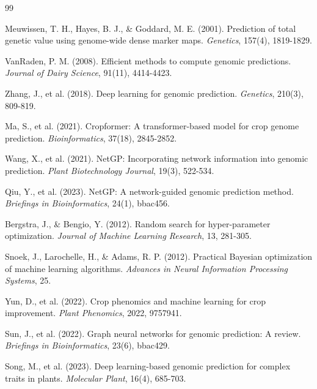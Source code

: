 \documentclass[11pt,a4paper]{article}
\begin{document}

\begin{thebibliography}{99}

Meuwissen, T. H., Hayes, B. J., \& Goddard, M. E. (2001).
Prediction of total genetic value using genome-wide dense marker maps.
\textit{Genetics}, 157(4), 1819-1829.

VanRaden, P. M. (2008).
Efficient methods to compute genomic predictions.
\textit{Journal of Dairy Science}, 91(11), 4414-4423.

Zhang, J., et al. (2018).
Deep learning for genomic prediction.
\textit{Genetics}, 210(3), 809-819.

Ma, S., et al. (2021).
Cropformer: A transformer-based model for crop genome prediction.
\textit{Bioinformatics}, 37(18), 2845-2852.

Wang, X., et al. (2021).
NetGP: Incorporating network information into genomic prediction.
\textit{Plant Biotechnology Journal}, 19(3), 522-534.

Qiu, Y., et al. (2023).
NetGP: A network-guided genomic prediction method.
\textit{Briefings in Bioinformatics}, 24(1), bbac456.

Bergstra, J., \& Bengio, Y. (2012).
Random search for hyper-parameter optimization.
\textit{Journal of Machine Learning Research}, 13, 281-305.

Snoek, J., Larochelle, H., \& Adams, R. P. (2012).
Practical Bayesian optimization of machine learning algorithms.
\textit{Advances in Neural Information Processing Systems}, 25.

Yun, D., et al. (2022).
Crop phenomics and machine learning for crop improvement.
\textit{Plant Phenomics}, 2022, 9757941.

Sun, J., et al. (2022).
Graph neural networks for genomic prediction: A review.
\textit{Briefings in Bioinformatics}, 23(6), bbac429.

Song, M., et al. (2023).
Deep learning-based genomic prediction for complex traits in plants.
\textit{Molecular Plant}, 16(4), 685-703.


\end{thebibliography}
\end{document}
